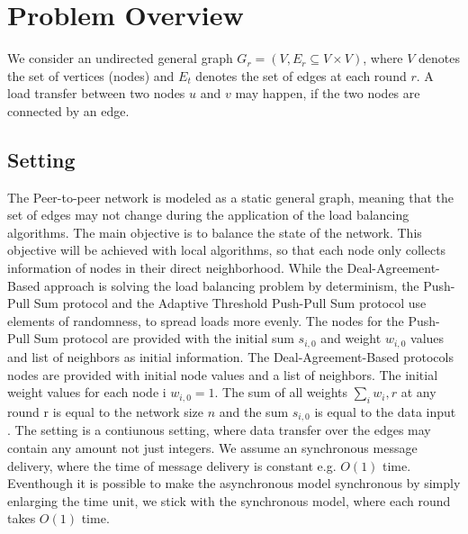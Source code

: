 \chapter{Problem Overview}\label{chap:problemoverview}
We consider an undirected general graph $G_r = (V, E_r \subseteq V \times V)$, where $V$ denotes the set of vertices (nodes) and $E_t$ denotes the set of edges at each round $r$. A load transfer between two nodes $u$ and $v$ may happen, if the two nodes are connected by an edge.

\section{Setting}\label{sec:setting}
The Peer-to-peer network is modeled as a static general graph, meaning that the set of edges may not change during the application of the load balancing algorithms. The main objective is to balance the state of the network. This objective will be achieved with local algorithms, so that each node only collects information of nodes in their direct neighborhood. While the Deal-Agreement-Based approach is solving the load balancing problem by determinism, the Push-Pull Sum protocol and the Adaptive Threshold Push-Pull Sum protocol use elements of randomness, to spread loads more evenly. The nodes for the Push-Pull Sum protocol are provided with the initial sum $s_{i,0}$ and weight $w_{i,0}$ values and list of neighbors as initial information. The Deal-Agreement-Based protocols nodes are provided with initial node values and a list of neighbors. The initial weight values for each node i $w_{i,0} = 1$. The sum of all weights $\sum_{i}{w_i,r}$ at any round r is equal to the network size $n$ and the sum $s_{i,0}$ is equal to the data input \cite{nugroho2023PushPullSumDataAg}. The setting is a contiunous setting, where data transfer over the edges may contain any amount not just integers. We assume an synchronous message delivery, where the time of message delivery is constant e.g. $O(1)$ time. Eventhough it is possible to make the asynchronous model synchronous by simply enlarging the time unit, we stick with the synchronous model, where each round takes $O(1)$ time.

